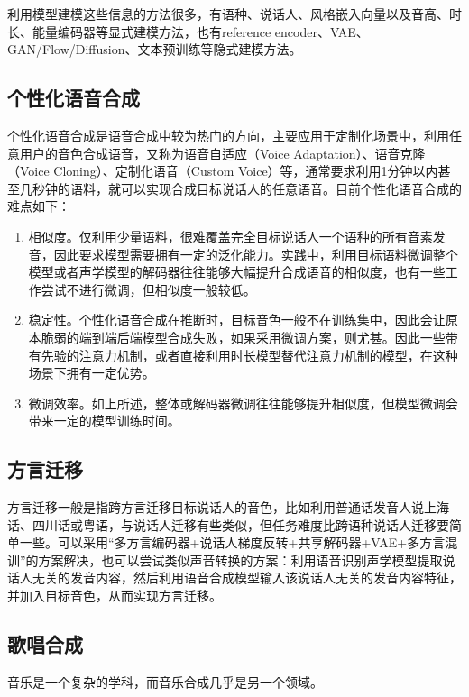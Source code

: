 \documentclass[cn,10pt,math=newtx,citestyle=gb7714-2015,bibstyle=gb7714-2015]{elegantbook}
\begin{document}
利用模型建模这些信息的方法很多，有语种、说话人、风格嵌入向量以及音高、时长、能量编码器等显式建模方法，也有reference encoder、VAE、GAN/Flow/Diffusion、文本预训练等隐式建模方法。

\subsection{个性化语音合成}

个性化语音合成是语音合成中较为热门的方向，主要应用于定制化场景中，利用任意用户的音色合成语音，又称为语音自适应（Voice Adaptation）、语音克隆（Voice Cloning）、定制化语音（Custom Voice）等，通常要求利用1分钟以内甚至几秒钟的语料，就可以实现合成目标说话人的任意语音。目前个性化语音合成的难点如下：

\begin{enumerate}
  \item 相似度。仅利用少量语料，很难覆盖完全目标说话人一个语种的所有音素发音，因此要求模型需要拥有一定的泛化能力。实践中，利用目标语料微调整个模型或者声学模型的解码器往往能够大幅提升合成语音的相似度，也有一些工作尝试不进行微调，但相似度一般较低。
  \item 稳定性。个性化语音合成在推断时，目标音色一般不在训练集中，因此会让原本脆弱的端到端后端模型合成失败，如果采用微调方案，则尤甚。因此一些带有先验的注意力机制，或者直接利用时长模型替代注意力机制的模型，在这种场景下拥有一定优势。
  \item 微调效率。如上所述，整体或解码器微调往往能够提升相似度，但模型微调会带来一定的模型训练时间。
\end{enumerate}

\subsection{方言迁移}

方言迁移一般是指跨方言迁移目标说话人的音色，比如利用普通话发音人说上海话、四川话或粤语，与说话人迁移有些类似，但任务难度比跨语种说话人迁移要简单一些。可以采用“多方言编码器+说话人梯度反转+共享解码器+VAE+多方言混训”的方案解决，也可以尝试类似声音转换的方案：利用语音识别声学模型提取说话人无关的发音内容，然后利用语音合成模型输入该说话人无关的发音内容特征，并加入目标音色，从而实现方言迁移。

\subsection{歌唱合成}

音乐是一个复杂的学科，而音乐合成几乎是另一个领域。
\end{document}
